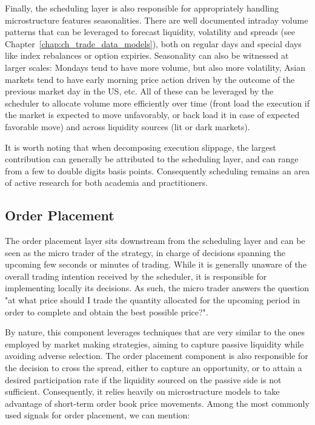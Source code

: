 Finally, the scheduling layer is also responsible for appropriately handling microstructure features seasonalities. There are well documented intraday volume patterns that can be leveraged to forecast liquidity, volatility and spreads (see Chapter~\ref{chap:ch_trade_data_models}), both on regular days and special days like index rebalances or option expiries. Seasonality can also be witnessed at larger scales: Mondays tend to have more volume, but also more volatility, Asian markets tend to have early morning price action driven by the outcome of the previous market day in the US, etc. All of these can be leveraged by the scheduler to allocate volume more efficiently over time (front load the execution if the market is expected to move unfavorably, or back load it in case of expected favorable move) and across liquidity sources (lit or dark markets). 

It is worth noting that when decomposing execution slippage, the largest contribution can generally be attributed to the scheduling layer, and can range from a few to double digits basis points. Consequently scheduling remains an area of active research for both academia and practitioners.

\subsection{Order Placement}

The order placement layer sits downstream from the scheduling layer and can be seen as the micro trader of the strategy, in charge of decisions spanning the upcoming few seconds or minutes of trading. While it is generally unaware of the overall trading intention received by the scheduler, it is responsible for implementing locally its decisions. As such, the micro trader answers the question "at what price should I trade the quantity allocated for the upcoming period in order to complete and obtain the best possible price?". 

By nature, this component leverages techniques that are very similar to the ones employed by market making strategies, aiming to capture passive liquidity while avoiding adverse selection. The order placement component is also responsible for the decision to cross the spread, either to capture an opportunity, or to attain a desired participation rate if the liquidity sourced on the passive side is not sufficient. Consequently, it relies heavily on microstructure models to take advantage of short-term order book price movements. Among the most commonly used signals for order placement, we can mention:

